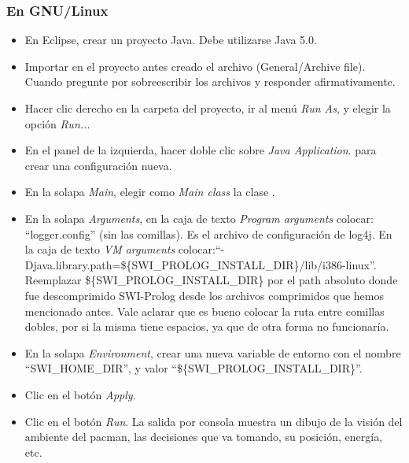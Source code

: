 \subsubsection{En GNU/Linux}
\begin{itemize}

\item En Eclipse, crear un proyecto Java. Debe utilizarse Java 5.0.

\item Importar en el proyecto antes creado el archivo 
(General/Archive file).  Cuando pregunte por sobreescribir los archivos
 y  responder afirmativamente.

\item Hacer clic derecho en la carpeta del proyecto, ir al menú \emph{Run As},
y elegir la opción \emph{Run...}

\item En el panel de la izquierda, hacer doble clic sobre \emph{Java Application}.
para crear una configuración nueva.

\item En la solapa \emph{Main}, elegir como \emph{Main class} la clase .

\item En la solapa \emph{Arguments}, en la caja de texto \emph{Program arguments} colocar:
``logger.config'' (sin las comillas). Es el archivo de configuración de log4j. En la caja de texto \emph{VM arguments}
colocar:\newline``-Djava.library.path=\$\{SWI\_PROLOG\_INSTALL\_DIR\}/lib/i386-linux''.\newline
Reemplazar \$\{SWI\_PROLOG\_INSTALL\_DIR\} por el path absoluto donde fue descomprimido SWI-Prolog desde los
archivos comprimidos que hemos mencionado antes. Vale aclarar que es bueno colocar la ruta entre comillas
dobles, por si la misma tiene espacios, ya que de otra forma no funcionaría.

\item En la solapa \emph{Environment}, crear una nueva variable de entorno con el nombre ``SWI\_HOME\_DIR'',
y valor ``\$\{SWI\_PROLOG\_INSTALL\_DIR\}''.

\item Clic en el botón \emph{Apply}.

\item Clic en el botón \emph{Run}. La salida por consola muestra un dibujo de
la visión del ambiente del pacman, las decisiones que va tomando, su posición,
energía, etc.

\end{itemize}


